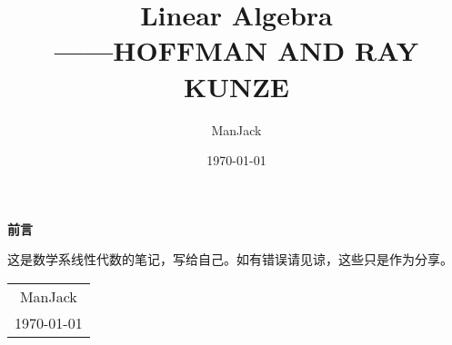 \documentclass[11pt, a4paper, oneside, UTF8]{ctexbook}
\title{{\Huge{\textbf{Linear Algebra}}}\\------HOFFMAN AND RAY KUNZE}
\author{ManJack}
\date{\today}
\newtheorem[M]{theorem}{Theorem}[section]
\newtheorem[M]{lemma}[theorem]{Lemma}
\newtheorem[M]{definition}{Definition}[section]
\begin{document}
\maketitle

\setcounter{page}{1}

\newpage
\begin{center}
  \Huge\textbf{前言}
\end{center}

这是数学系线性代数的笔记，写给自己。如有错误请见谅，这些只是作为分享。

\begin{flushright}
  \begin{tabular}{c}
    ManJack \\
    \today
  \end{tabular}
\end{flushright}

\newpage
\tableofcontents
\newpage
{}
\setcounter{page}{1}





\end{document}
